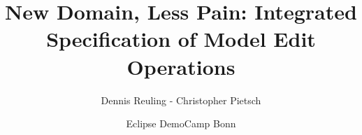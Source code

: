 %
%
\title[SiLift]{New Domain, Less Pain: Integrated Specification of Model Edit Operations}
\subtitle{}
\author[D. Reuling\\C. Pietsch]{Dennis Reuling - Christopher Pietsch}
\date[24.11.2014]{Eclipse DemoCamp Bonn}

%
%


\usepackage[english]{babel}

%
%
\newcommand{\allSections}{







}
